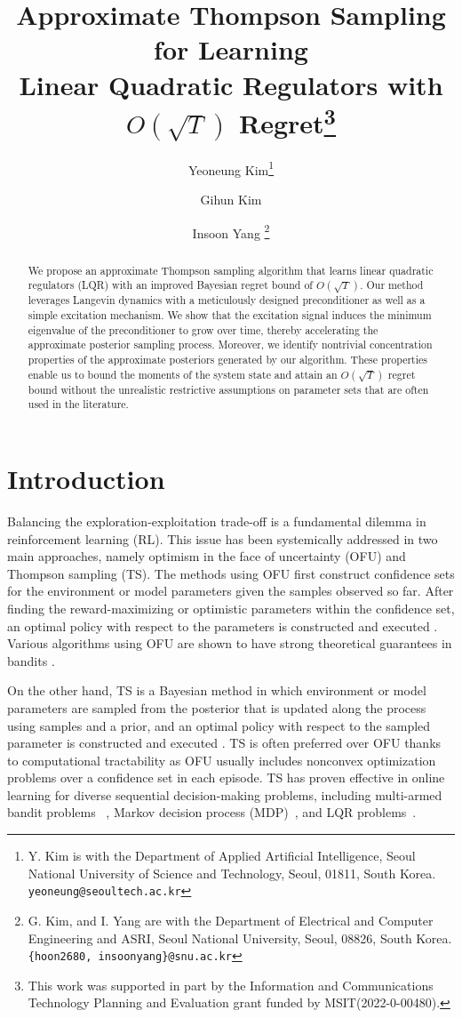 \documentclass[11pt]{article}
\title{Approximate Thompson Sampling for Learning\\ Linear Quadratic Regulators with $O(\sqrt{T})$ Regret\thanks{This work was supported in part by the  Information and Communications Technology Planning and Evaluation grant funded by MSIT(2022-0-00480). 
}}
\author{Yeoneung Kim\thanks{
 Y. Kim is with the Department of Applied Artificial Intelligence, Seoul National University of Science and Technology, Seoul, 01811, South Korea. {\tt\small  yeoneung@seoultech.ac.kr}}
 \and
Gihun Kim \and
 Insoon Yang
\thanks{G. Kim, and I. Yang are with the Department of Electrical and Computer Engineering and ASRI, Seoul National University, Seoul, 08826, South Korea. {\tt\small  \{hoon2680, insoonyang\}@snu.ac.kr}}
}
\date{}
\theoremstyle{plain}
\theoremstyle{definition}
\theoremstyle{remark}
\begin{document}
\maketitle

\pagestyle{myheadings}
\thispagestyle{plain}


\begin{abstract}
We propose an approximate Thompson sampling algorithm that learns linear quadratic regulators (LQR) with an improved Bayesian regret bound of $O(\sqrt{T})$. Our method leverages Langevin dynamics with a meticulously designed preconditioner as well as a simple excitation mechanism. We show that the excitation signal induces the minimum eigenvalue of the preconditioner to grow over time, thereby accelerating the approximate posterior sampling process. Moreover, we identify nontrivial concentration properties of the approximate posteriors generated by our algorithm. These properties enable us to bound the moments of the system state and attain an $O(\sqrt{T})$ regret bound without the unrealistic restrictive assumptions on parameter sets that are often used in the literature.
\end{abstract}

\section{Introduction}\label{sec:intro}
Balancing the exploration-exploitation trade-off is a fundamental dilemma in  reinforcement learning (RL). This issue has been systemically addressed in two main approaches, namely optimism in the face of uncertainty (OFU) and Thompson sampling (TS). The methods using OFU first construct confidence sets for the environment or model parameters given the samples observed so far. After finding the reward-maximizing or optimistic parameters within the confidence set, an optimal policy with respect to the parameters is constructed and executed \cite{lai1985asymptotically}. Various algorithms using OFU are shown to have strong theoretical guarantees in bandits \cite{kearns2002near}. 

On the other hand, TS is a Bayesian method in which environment or model parameters are sampled from the posterior that is updated along the process using samples and a prior, and an optimal policy with respect to the sampled parameter is constructed and executed \cite{thompson1933likelihood}. TS is often preferred over OFU thanks to computational tractability as OFU usually includes nonconvex optimization problems over a confidence set in each episode. TS has proven effective in online learning for diverse sequential decision-making problems, including multi-armed bandit problems ~\cite{agrawal2012analysis, agrawal2013thompson, kaufmann2012thompson}, Markov decision process (MDP)~\cite{osband2013more, osband2016posterior, gopalan2015thompson}, and LQR problems~\cite{ouyang2019posterior, osband2016posterior, abbasi2015bayesian, abeille2017thompson, faradonbeh2020adaptive}.
\end{document}
